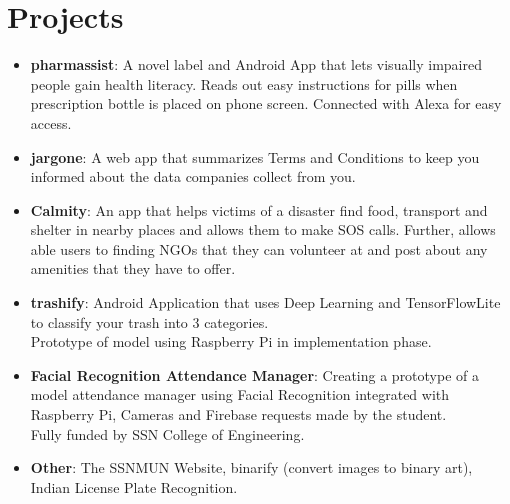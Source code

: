 \documentclass[letterpaper,11pt]{article}
\newcommand{\resumeItem}[2]{
  \item\small{
    \textbf{#1}{: #2 \vspace{-2pt}}
  }
}
\newcommand{\resumeSubItem}[2]{\resumeItem{#1}{#2}\vspace{-4pt}}
\newcommand{\resumeSubHeadingListStart}{\begin{itemize}[leftmargin=*]}
\newcommand{\resumeSubHeadingListEnd}{\end{itemize}}
\begin{document}
\section{Projects}
 \resumeSubHeadingListStart
  	\resumeSubItem{pharmassist}
      {A novel label and Android App that lets visually impaired people gain health literacy. Reads out easy instructions for pills when prescription bottle is placed on phone screen. Connected with Alexa for easy access.}
  \resumeSubItem{jargone}
      {A web app that summarizes Terms and Conditions to keep you informed about the data companies collect from you.}
    \resumeSubItem{Calmity}
      {An app that helps victims of a disaster find food, transport and shelter in nearby places and allows them to make SOS calls. Further, allows able users to finding NGOs that they can volunteer at and post about any amenities that they have to offer.}
      \resumeSubItem{trashify}
      {Android Application that uses Deep Learning and TensorFlowLite to classify your trash into 3 categories.\\Prototype of model using Raspberry Pi in implementation phase.}

    \resumeSubItem{Facial Recognition Attendance Manager}
      {Creating a prototype of a model attendance manager using Facial Recognition integrated with Raspberry Pi, Cameras and Firebase requests made by the student. \\Fully funded by SSN College of Engineering.}
      \resumeSubItem{Other}
      {The SSNMUN Website, binarify (convert images to binary art), Indian License Plate Recognition.}
  \resumeSubHeadingListEnd

\end{document}
